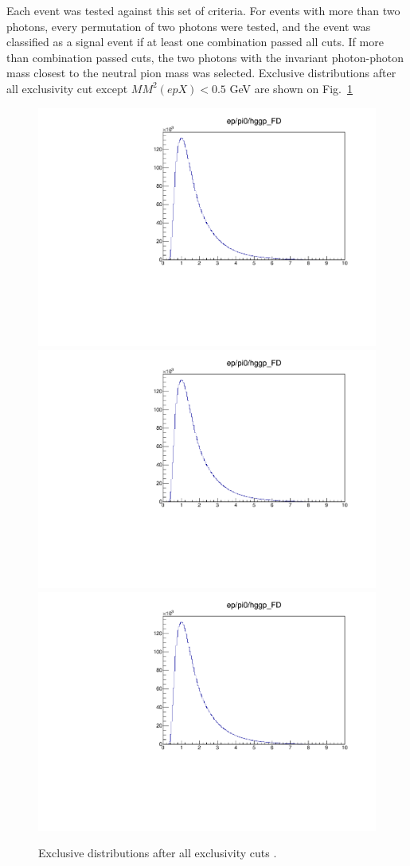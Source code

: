     Each event was tested against this set of criteria. For events with more than two photons, every permutation of two photons were tested, and the event was classified as a signal event if at least one combination passed all cuts. If more than combination passed cuts, the two photons with the invariant photon-photon mass closest to the neutral pion mass was selected. Exclusive distributions after all exclusivity cut except $MM^2(epX)<0.5$ GeV are shown on Fig.~\ref{fig:finalexclusive}
    
    \begin{figure}[hbt]
    	\centering
    	
    	\includegraphics[page=82,width=0.32\linewidth]{Chapters/Ch4-BaseAnalysis/1_Event_Selection_Cuts/figures/eppi0.exclusive.pdf}
    	\includegraphics[page=83,width=0.32\linewidth]{Chapters/Ch4-BaseAnalysis/1_Event_Selection_Cuts/figures/eppi0.exclusive.pdf}
    	\includegraphics[page=84,width=0.32\linewidth]{Chapters/Ch4-BaseAnalysis/1_Event_Selection_Cuts/figures/eppi0.exclusive.pdf}
    	\caption{Exclusive distributions after all exclusivity cuts .}
    	\label{fig:finalexclusive}
    \end{figure}











\iffalse



